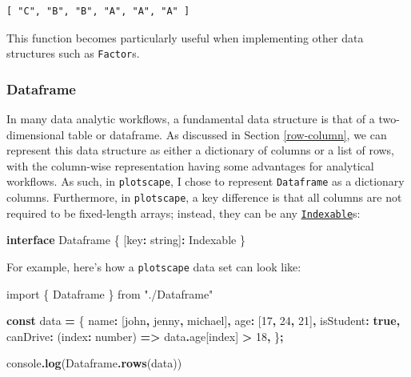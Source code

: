 \documentclass[
  openany]{book}
\newenvironment{Shaded}{\begin{snugshade}}{\end{snugshade}}
\newcommand{\AttributeTok}[1]{\textcolor[rgb]{0.13,0.29,0.53}{#1}}
\newcommand{\BuiltInTok}[1]{#1}
\newcommand{\DataTypeTok}[1]{\textcolor[rgb]{0.13,0.29,0.53}{#1}}
\newcommand{\DecValTok}[1]{\textcolor[rgb]{0.00,0.00,0.81}{#1}}
\newcommand{\FunctionTok}[1]{\textcolor[rgb]{0.13,0.29,0.53}{\textbf{#1}}}
\newcommand{\ImportTok}[1]{#1}
\newcommand{\KeywordTok}[1]{\textcolor[rgb]{0.13,0.29,0.53}{\textbf{#1}}}
\newcommand{\NormalTok}[1]{#1}
\newcommand{\OperatorTok}[1]{\textcolor[rgb]{0.81,0.36,0.00}{\textbf{#1}}}
\newcommand{\StringTok}[1]{\textcolor[rgb]{0.31,0.60,0.02}{#1}}
\newcommand{\VerbatimStringTok}[1]{\textcolor[rgb]{0.31,0.60,0.02}{#1}}
\theoremstyle{definition}
\theoremstyle{definition}
\theoremstyle{definition}
\theoremstyle{definition}
\theoremstyle{remark}
\begin{document}
\begin{verbatim}
[ "C", "B", "B", "A", "A", "A" ]
\end{verbatim}

This function becomes particularly useful when implementing other data structures such as \texttt{Factor}s.

\subsubsection{Dataframe}\label{dataframe}

In many data analytic workflows, a fundamental data structure is that of a two-dimensional table or dataframe. As discussed in Section \ref{row-column}, we can represent this data structure as either a dictionary of columns or a list of rows, with the column-wise representation having some advantages for analytical workflows. As such, in \texttt{plotscape}, I chose to represent \texttt{Dataframe} as a dictionary columns. Furthermore, in \texttt{plotscape}, a key difference is that all columns are not required to be fixed-length arrays; instead, they can be any \hyperref[indexable]{\texttt{Indexable}}s:

\begin{Shaded}
\begin{Highlighting}[]
\KeywordTok{interface}\NormalTok{ Dataframe \{}
\NormalTok{  [key}\OperatorTok{:} \DataTypeTok{string}\NormalTok{]}\OperatorTok{:}\NormalTok{ Indexable}
\NormalTok{\}}
\end{Highlighting}
\end{Shaded}

For example, here's how a \texttt{plotscape} data set can look like:

\begin{Shaded}
\begin{Highlighting}[]
\ImportTok{import}\NormalTok{ \{ Dataframe \} }\ImportTok{from} \StringTok{"./Dataframe"}

\KeywordTok{const}\NormalTok{ data }\OperatorTok{=}\NormalTok{ \{}
\NormalTok{  name}\OperatorTok{:}\NormalTok{ [}\VerbatimStringTok{\textasciigrave{}john\textasciigrave{}}\OperatorTok{,} \VerbatimStringTok{\textasciigrave{}jenny\textasciigrave{}}\OperatorTok{,} \VerbatimStringTok{\textasciigrave{}michael\textasciigrave{}}\NormalTok{]}\OperatorTok{,}
\NormalTok{  age}\OperatorTok{:}\NormalTok{ [}\DecValTok{17}\OperatorTok{,} \DecValTok{24}\OperatorTok{,} \DecValTok{21}\NormalTok{]}\OperatorTok{,}
\NormalTok{  isStudent}\OperatorTok{:} \KeywordTok{true}\OperatorTok{,}
\NormalTok{  canDrive}\OperatorTok{:}\NormalTok{ (index}\OperatorTok{:} \DataTypeTok{number}\NormalTok{) }\KeywordTok{=\textgreater{}}\NormalTok{ data}\OperatorTok{.}\AttributeTok{age}\NormalTok{[index] }\OperatorTok{\textgreater{}} \DecValTok{18}\OperatorTok{,}
\NormalTok{\}}\OperatorTok{;}

\BuiltInTok{console}\OperatorTok{.}\FunctionTok{log}\NormalTok{(Dataframe}\OperatorTok{.}\FunctionTok{rows}\NormalTok{(data))}
\end{Highlighting}
\end{Shaded}
\end{document}
